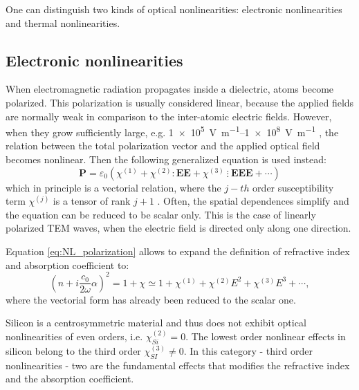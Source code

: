 One can distinguish two kinds of optical nonlinearities: electronic nonlinearities and thermal nonlinearities.


\subsection{Electronic nonlinearities}
\label{ssec:Electronic_nonlinearities}
When electromagnetic radiation propagates inside a dielectric, atoms become polarized.
This polarization is usually considered linear, because the applied fields are normally weak in comparison to the inter-atomic electric fields.
However, when they grow sufficiently large, e.g. \SIrange[retain-unity-mantissa = false,range-units = single]{1e5}{1e8}{\V\per\m} \cite{Saleh1991}, the relation between the total polarization vector and the applied optical field becomes nonlinear.
Then the following generalized equation is used instead:
\begin{equation}
\textbf{P} = \varepsilon_0 \left(\chi^{(1)} + \chi^{(2)}:\textbf{EE}+\chi^{(3)}~\vdots~\textbf{EEE} + \cdots \right)
\label{eq:NL_polarization}
\end{equation}
which in principle is a vectorial relation, where the $j-th$ order susceptibility term $\chi^{(j)}$ is a tensor of rank $j+1$ \cite{Agrawal2001}.
Often, the spatial dependences simplify and the equation can be reduced to be scalar only.
This is the case of linearly polarized TEM waves, when the electric field is directed only along one direction.

Equation \ref{eq:NL_polarization} allows to expand the definition of refractive index and absorption coefficient to:
\begin{equation}
	\left( n+i\frac{c_0}{2\omega}\alpha \right)^2 = 1+\chi
	\simeq 1 + \chi^{(1)} + \chi^{(2)} E^2 + \chi^{(3)} E^3 + \cdots,
\end{equation}
where the vectorial form has already been reduced to the scalar one.

Silicon is a centrosymmetric material and thus does not exhibit optical nonlinearities of even orders, i.e. $\chi^{(2)}_{Si} = 0$.
The lowest order nonlinear effects in silicon belong to the third order $\chi^{(3)}_{SI}\neq 0$.
In this category - third order nonlinearities - two are the fundamental effects that modifies the refractive index and the absorption coefficient.

